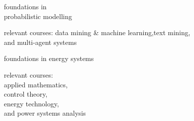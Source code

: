 \begin{minipage}[t]{0.33\textwidth}
\begin{tightitemize}
\item foundations in \\probabilistic modelling 
\item relevant courses: data mining \& machine learning,text mining,\\and multi-agent systems 
\end{tightitemize}
\vspace{7pt}

\begin{tightitemize}
\item foundations in energy systems 
\item relevant courses: \\applied mathematics,\\ control theory, \\energy technology,\\and power systems analysis
\end{tightitemize}
\vspace{8pt}

\sectionspace %


\sectionspace %
\end{minipage} %
\hfill
%
%
